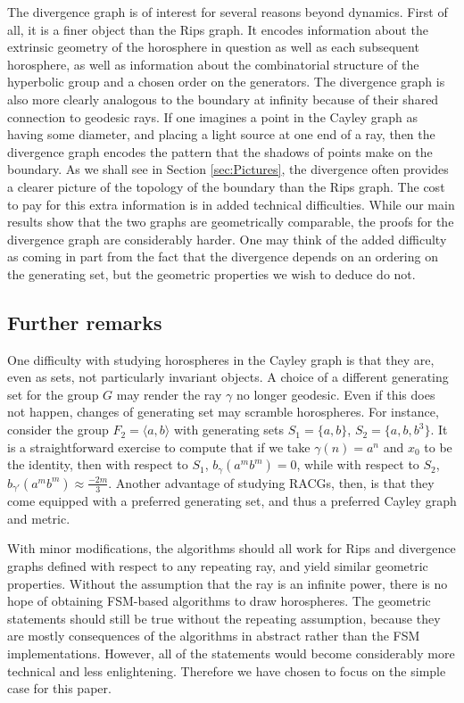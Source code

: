 \documentclass{amsart}
\theoremstyle{definition}
\theoremstyle{remark}
\begin{document}
    The divergence graph is of interest for several reasons beyond dynamics. First of all, it is a finer object than the Rips graph. It encodes information about the extrinsic geometry of the horosphere in question as well as each subsequent horosphere, as well as information about the combinatorial structure of the hyperbolic group and a chosen order on the generators. The divergence graph is also more clearly analogous to the boundary at infinity because of their shared connection to geodesic rays. If one imagines a point in the Cayley graph as having some diameter, and placing a light source at one end of a ray, then the divergence graph encodes the pattern that the shadows of points make on the boundary. As we shall see in Section \ref{sec:Pictures}, the divergence often provides a clearer picture of the topology of the boundary than the Rips graph. The cost to pay for this extra information is in added technical difficulties. While our main results show that the two graphs are geometrically comparable, the proofs for the divergence graph are considerably harder. One may think of the added difficulty as coming in part from the fact that the divergence depends on an ordering on the generating set, but the geometric properties we wish to deduce do not.
	
    \subsection*{Further remarks}
    
    One difficulty with studying horospheres in the Cayley graph is that they are, even as sets, not particularly invariant objects. A choice of a different generating set for the group $G$ may render the ray $\gamma$ no longer geodesic. Even if this does not happen, changes of generating set may scramble horospheres. For instance, consider the group $F_2=\langle a, b\rangle$ with generating sets $S_1=\{a,b\}$, $S_2=\{a, b, b^3\}$. It is a straightforward exercise to compute that if we take $\gamma(n)=a^n$ and $x_0$ to be the identity, then with respect to $S_1$, $b_\gamma(a^mb^m)=0$, while with respect to $S_2$, $b_{\gamma'}(a^mb^m)\approx \frac{-2m}{3}$. Another advantage of studying RACGs, then, is that they come equipped with a preferred generating set, and thus a preferred Cayley graph and metric.
	
	With minor modifications, the algorithms should all work for Rips and divergence graphs defined with respect to any repeating ray, and yield similar geometric properties. Without the assumption that the ray is an infinite power, there is no hope of obtaining FSM-based algorithms to draw horospheres. The geometric statements should still be true without the repeating assumption, because they are mostly consequences of the algorithms in abstract rather than the FSM implementations. However, all of the statements would become considerably more technical and less enlightening. Therefore we have chosen to focus on the simple case for this paper.
	
\end{document}

